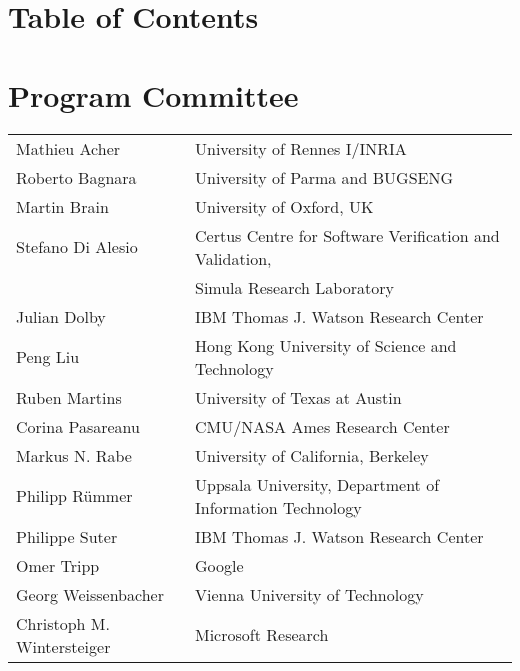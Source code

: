 

\clearpage


\section*{Table of Contents}

\clearpage


\section*{Program Committee}
\noindent
\begin{longtable}{p{}p{}}
Mathieu Acher & University of Rennes I/INRIA\\
Roberto Bagnara & University of Parma and BUGSENG\\
Martin Brain & University of Oxford, UK\\
Stefano Di Alesio & Certus Centre for Software Verification and Validation,\\ 
  & Simula Research Laboratory\\
Julian Dolby & IBM Thomas J. Watson Research Center\\
Peng Liu & Hong Kong University of Science and Technology\\
Ruben Martins & University of Texas at Austin\\
Corina Pasareanu & CMU/NASA Ames Research Center\\
Markus N. Rabe & University of California, Berkeley\\
Philipp R{\"u}mmer & Uppsala University, Department of Information Technology\\
Philippe Suter & IBM Thomas J. Watson Research Center\\
Omer Tripp & Google\\
Georg Weissenbacher & Vienna University of Technology\\
Christoph M. Wintersteiger & Microsoft Research\\
\end{longtable}

\clearpage
